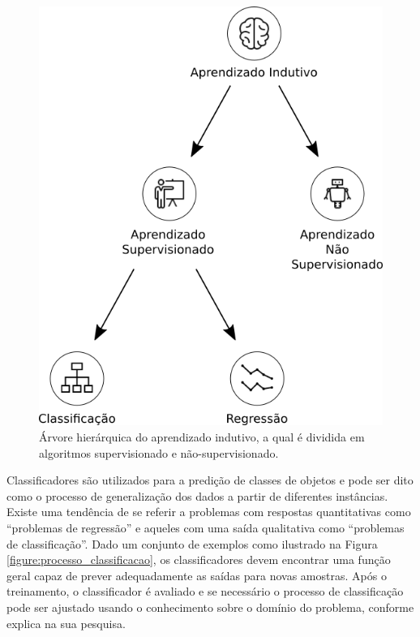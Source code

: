 \begin{figure}[H]
\begin{center}
    \includegraphics[scale=0.40]{images/aprendizado_indutivo.png}
\end{center}
\caption{Árvore hierárquica do aprendizado indutivo, a qual é dividida em 
algoritmos supervisionado e não-supervisionado.}
\label{figure:aprendizado_indutivo}
\end{figure}

Classificadores são utilizados para a predição de classes de objetos e pode ser 
dito como o processo de generalização dos dados a partir de diferentes 
instâncias. Existe uma tendência de se referir a problemas com respostas 
quantitativas como ``problemas de regressão'' e aqueles com uma saída 
qualitativa como ``problemas de classificação''. Dado um conjunto de exemplos 
como ilustrado na Figura \ref{figure:processo_classificacao}, os 
classificadores devem encontrar uma função geral capaz de prever adequadamente 
as saídas para novas amostras. Após o treinamento, o classificador é avaliado e 
se necessário o processo de classificação pode ser ajustado usando o 
conhecimento sobre o domínio do problema, conforme 
 explica na sua pesquisa.

